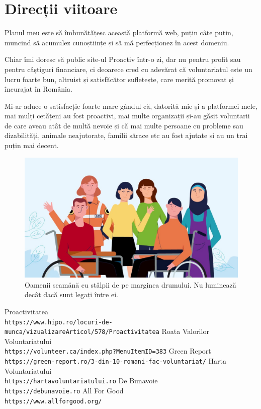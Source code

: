 \documentclass[12pt,a4paper]{report}
\begin{document}
\section{Direcții viitoare}
\par
Planul meu este să îmbunătățesc această platformă web, puțin câte puțin, muncind să acumulez cunoștiințe și să mă perfecționez în acest domeniu.
\\ \par
Chiar îmi doresc să public site-ul Proactiv într-o zi, dar nu pentru profit sau pentru câștiguri financiare, ci deoarece cred cu adevărat că voluntariatul este un lucru foarte bun, altruist și satisfăcător sufletește, care merită promovat și încurajat în România.
\\ \par
Mi-ar aduce o satisfacție foarte mare gândul că, datorită mie și a platformei mele, mai mulți cetățeni au fost proactivi, mai multe organizații și-au găsit voluntarii de care aveau atât de multă nevoie și că mai multe persoane cu probleme sau dizabilități, animale neajutorate, familii sărace etc au fost ajutate și au un trai puțin mai decent.
\\
\begin{figure}[H]
\centering
  \includegraphics[width=1\linewidth]{./imagini/theend.jpg}
  \caption{Oamenii seamănă cu stâlpii de pe marginea drumului. Nu luminează decât dacă sunt legați între ei.}
\end{figure}


\begin{thebibliography}{1}
Proactivitatea
\\\texttt{https://www.hipo.ro/locuri-de-munca/vizualizareArticol/578/Proactivitatea}
Roata Valorilor Voluntariatului
\\\texttt{https://volunteer.ca/index.php?MenuItemID=383}
Green Report
\\\texttt{https://green-report.ro/3-din-10-romani-fac-voluntariat/}
Harta Voluntariatului
\\\texttt{https://hartavoluntariatului.ro}
De Bunavoie
\\\texttt{https://debunavoie.ro}
All For Good
\\\texttt{https://www.allforgood.org/}
\end{thebibliography}
\end{document}
